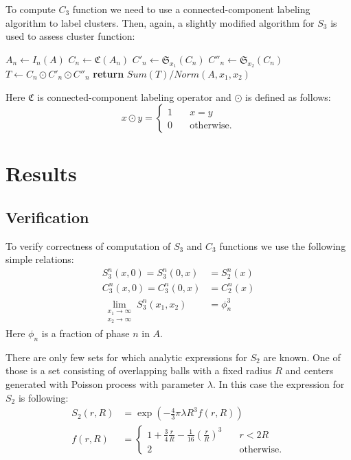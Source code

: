 \documentclass[reprint,amsmath,amssymb,aps,pre,showkeys,showpacs]{revtex4-1}
\begin{document}
To compute $C_3$ function we need to use a connected-component labeling
algorithm \cite{4728561,PhysRevB.14.3438} to label clusters. Then, again, a
slightly modified algorithm for $S_3$ is used to assess cluster function:
\begin{algorithmic}[1]
  \State $A_n \gets I_n (A)$
  \State $C_n \gets \mathfrak{C}(A_n)$
  \State $C'_n \gets \mathfrak{S}_{x_1}(C_n)$
  \State $C''_n \gets \mathfrak{S}_{x_2}(C_n)$
  \State $T \gets C_n \odot C'_n \odot C''_n$
  \State \textbf{return} $Sum(T) / Norm(A, x_1, x_2)$
  \EndProcedure
\end{algorithmic}
Here $\mathfrak{C}$ is connected-component labeling operator and $\odot$ is
defined as follows:
\begin{equation}
  x \odot y = \left\{
  \begin{array}{ll}
    1 & \quad x = y \\
    0 & \quad \text{otherwise}.
  \end{array}
  \right.
\end{equation}

\section{Results}
\subsection{Verification}
To verify correctness of computation of $S_3$ and $C_3$ functions we use the
following simple relations:
\begin{align}
  S_3^n (x, 0) = S_3^n (0, x) &= S_2^n(x) \\
  C_3^n (x, 0) = C_3^n (0, x) &= C_2^n(x) \\
  \lim_{\substack{x_1 \to \infty \\ x_2 \to \infty}} S_3^n (x_1, x_2) &= \phi_n^3
\end{align}
Here $\phi_n$ is a fraction of phase $n$ in $A$.

There are only few sets for which analytic expressions for $S_2$ are known. One
of those is a set consisting of overlapping balls with a fixed radius $R$ and
centers generated with Poisson process with parameter $\lambda$. In this case
the expression for $S_2$ is following:
\begin{equation}
  \begin{aligned}
    S_2(r, R) &= \exp(-\frac{4}{3}\pi\lambda R^3 f(r, R)) \\
    f(r, R) &= \left\{
    \begin{array}{ll}
      1 + \frac{3}{4} \frac{r}{R} - \frac{1}{16} (\frac{r}{R})^3 & \quad r < 2R \\
      2 & \quad \text{otherwise}.
    \end{array}
    \right.
  \end{aligned}
  \label{eq:s2-balls}
\end{equation}
\end{document}
